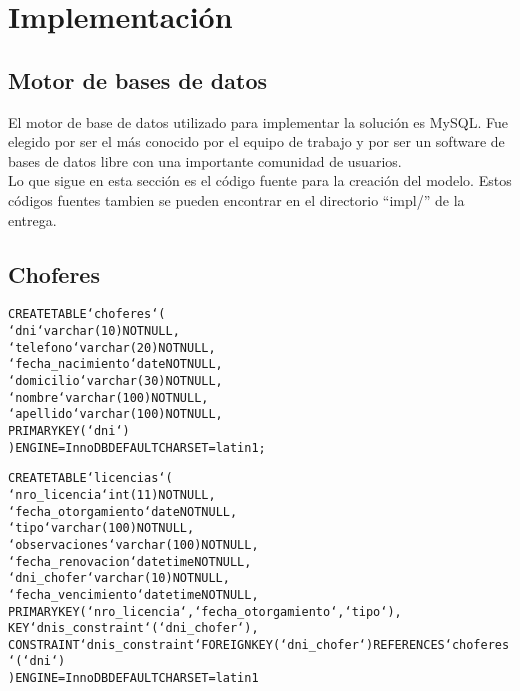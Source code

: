 \section{Implementaci\'on}

\subsection{Motor de bases de datos}
El motor de base de datos utilizado para implementar la soluci\'on es MySQL. Fue elegido por ser el m\'as 
conocido por el equipo de trabajo y por ser un software de bases de datos libre con una importante comunidad de usuarios. \\
Lo que sigue en esta secci\'on es el c\'odigo fuente para la creaci\'on del modelo. Estos c\'odigos fuentes tambien se pueden
encontrar en el directorio ``impl/'' de la entrega.

\subsection{Choferes}



\newenvironment{sql}
{\begin{flushleft}\begin{alltt}\color{sqlCode}}
{\end{alltt}\end{flushleft}}


\begin{sql}

CREATE TABLE  `choferes` (
  `dni` varchar(10) NOT NULL,
  `telefono` varchar(20) NOT NULL,
  `fecha_nacimiento` date NOT NULL,
  `domicilio` varchar(30) NOT NULL,
  `nombre` varchar(100) NOT NULL,
  `apellido` varchar(100) NOT NULL,
  PRIMARY KEY (`dni`)
) ENGINE=InnoDB DEFAULT CHARSET=latin1;

CREATE TABLE  `licencias` (
  `nro_licencia` int(11) NOT NULL,
  `fecha_otorgamiento` date NOT NULL,
  `tipo` varchar(100) NOT NULL,
  `observaciones` varchar(100) NOT NULL,
  `fecha_renovacion` datetime NOT NULL,
  `dni_chofer` varchar(10) NOT NULL,
  `fecha_vencimiento` datetime NOT NULL,
  PRIMARY KEY (`nro_licencia`,`fecha_otorgamiento`,`tipo`),
  KEY `dnis_constraint` (`dni_chofer`),
  CONSTRAINT `dnis_constraint` FOREIGN KEY (`dni_chofer`) REFERENCES `choferes` (`dni`)
) ENGINE=InnoDB DEFAULT CHARSET=latin1

\end{sql}

